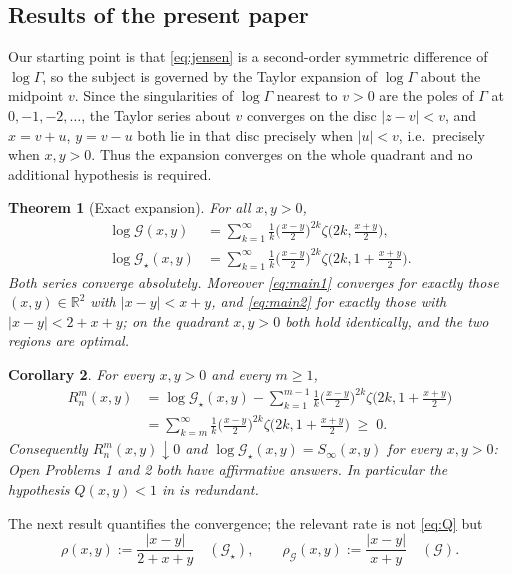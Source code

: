 \documentclass[11pt,a4paper]{amsart}
\newtheorem{theorem}{Theorem}[section]
\newtheorem{corollary}[theorem]{Corollary}
\theoremstyle{definition}
\newcommand{\Gg}{\mathcal{G}}
\newcommand{\Gs}{\mathcal{G}_{\star}}
\newcommand{\R}{\mathbb{R}}
\begin{document}
\subsection{Results of the present paper}
Our starting point is that \eqref{eq:jensen} is a second-order symmetric difference of
$\log\Gamma$, so the subject is governed by the Taylor expansion of $\log\Gamma$ about the
midpoint $v$. Since the singularities of $\log\Gamma$ nearest to $v>0$ are the poles of
$\Gamma$ at $0,-1,-2,\dots$, the Taylor series about $v$ converges on the disc $|z-v|<v$,
and $x=v+u$, $y=v-u$ both lie in that disc precisely when $|u|<v$, i.e.\ precisely when
$x,y>0$. Thus the expansion converges on the whole quadrant and no additional hypothesis is
required.

\begin{theorem}[Exact expansion]\label{thm:main}
For all $x,y>0$,
\begin{align}
  \log\Gg(x,y)&=\sum_{k=1}^{\infty}\frac{1}{k}\Big(\frac{x-y}{2}\Big)^{2k}
      \zeta\Big(2k,\frac{x+y}{2}\Big),\label{eq:main1}\\[1mm]
  \log\Gs(x,y)&=\sum_{k=1}^{\infty}\frac{1}{k}\Big(\frac{x-y}{2}\Big)^{2k}
      \zeta\Big(2k,1+\frac{x+y}{2}\Big).\label{eq:main2}
\end{align}
Both series converge absolutely. Moreover \eqref{eq:main1} converges for exactly those
$(x,y)\in\R^{2}$ with $|x-y|<x+y$, and \eqref{eq:main2} for exactly those with
$|x-y|<2+x+y$; on the quadrant $x,y>0$ both hold identically, and the two regions are
optimal.
\end{theorem}

\begin{corollary}\label{cor:open12}
For every $x,y>0$ and every $m\ge1$,
\begin{align*}
  R^{m}_{n}(x,y)&=\log\Gs(x,y)-\sum_{k=1}^{m-1}\frac{1}{k}\Big(\frac{x-y}{2}\Big)^{2k}
     \zeta\Big(2k,1+\frac{x+y}{2}\Big)\\
  &=\sum_{k=m}^{\infty}\frac{1}{k}\Big(\frac{x-y}{2}\Big)^{2k}
     \zeta\Big(2k,1+\frac{x+y}{2}\Big)\;\ge\;0 .
\end{align*}
Consequently $R^{m}_{n}(x,y)\downarrow0$ and $\log\Gs(x,y)=S_{\infty}(x,y)$ for
\emph{every} $x,y>0$: Open Problems 1 and 2 both have affirmative answers. In particular
the hypothesis $Q(x,y)<1$ in \cite[Cor.~1]{Wisniewska25} is redundant.
\end{corollary}

The next result quantifies the convergence; the relevant rate is not \eqref{eq:Q} but
\begin{equation}\label{eq:rho}
  \rho(x,y):=\frac{|x-y|}{2+x+y}\quad(\Gs),\qquad
  \rho_{\Gg}(x,y):=\frac{|x-y|}{x+y}\quad(\Gg).
\end{equation}
\end{document}
